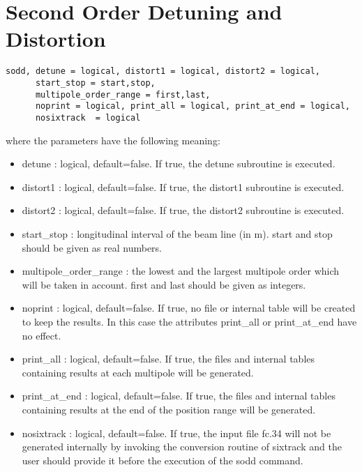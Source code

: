 
\chapter{Second Order Detuning and Distortion} %

\begin{verbatim}
sodd, detune = logical, distort1 = logical, distort2 = logical,
      start_stop = start,stop,
      multipole_order_range = first,last,
      noprint = logical, print_all = logical, print_at_end = logical,
      nosixtrack  = logical
\end{verbatim} 

where the parameters have the following meaning: 
\begin{itemize}
   \item detune : logical, default=false. If true, the detune subroutine
     is executed.  
   \item distort1 : logical, default=false. If true, the distort1
     subroutine is executed.  
   \item distort2 : logical, default=false. If true, the distort2
     subroutine is executed.  
   \item start\_stop : longitudinal interval of the beam line (in
     m). start and stop should be given as real numbers.  
   \item multipole\_order\_range : the lowest and the largest multipole
     order which will be taken in account. first and last should be
     given as integers.  
   \item noprint : logical, default=false. If true, no file or internal
     table will be created to keep the results. In this case the
     attributes print\_all or print\_at\_end have no effect.  
   \item print\_all : logical, default=false. If true, the files and
     internal tables containing results at each multipole will be
     generated.  
   \item print\_at\_end : logical, default=false. If true, the files and
     internal tables containing results at the end of the position range
     will be generated.  
   \item nosixtrack  : logical, default=false. If true, the input file
     fc.34 will not be generated internally by invoking the conversion
     routine of sixtrack and the user should provide it before the
     execution of the sodd command.  
\end{itemize}

